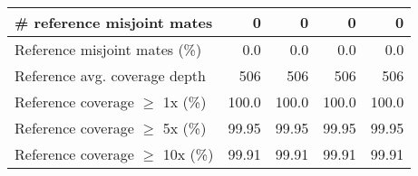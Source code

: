 \documentclass[12pt,a4paper]{article}
\begin{document}
\begin{table}[ht]
\begin{center}
\begin{tabular}{|l*{4}{|r}|}
\# reference misjoint mates & 0 & 0 & 0 & 0 \\ \hline
Reference misjoint mates (\%) & 0.0 & 0.0 & 0.0 & 0.0 \\ \hline
Reference avg. coverage depth & 506 & 506 & 506 & 506 \\ \hline
Reference coverage $\geq$ 1x (\%) & 100.0 & 100.0 & 100.0 & 100.0 \\ \hline
Reference coverage $\geq$ 5x (\%) & 99.95 & 99.95 & 99.95 & 99.95 \\ \hline
Reference coverage $\geq$ 10x (\%) & 99.91 & 99.91 & 99.91 & 99.91 \\ \hline
\end{tabular}
\end{center}
\end{table}
\end{document}
